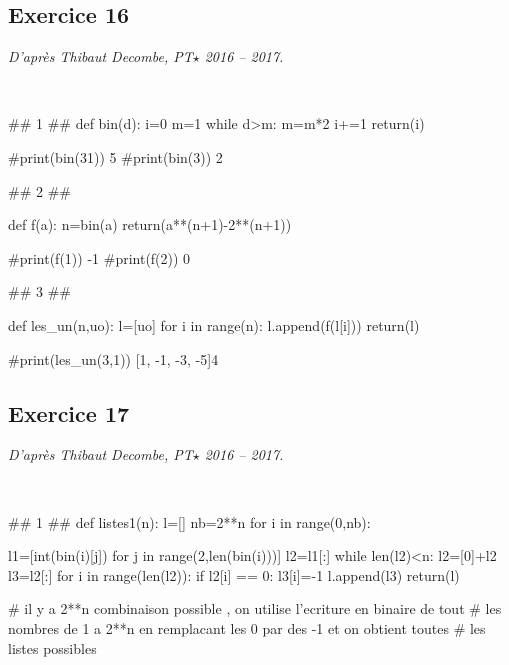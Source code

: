 \documentclass[10pt,fleqn]{article} %
\begin{document}
\subsection*{Exercice 16}
\textit{D'après Thibaut Decombe, PT$\star$ 2016 -- 2017.}
\begin{corrige}
$\quad$
\begin{python}
## 1 ##
def bin(d):
    i=0
    m=1
    while d>m:
        m=m*2
        i+=1
    return(i)

#print(bin(31))     5
#print(bin(3))      2

## 2 ##

def f(a):
    n=bin(a)
    return(a**(n+1)-2**(n+1))

#print(f(1))      -1
#print(f(2))       0


## 3 ##

def les_un(n,uo):
    l=[uo]
    for i in range(n):
        l.append(f(l[i]))
    return(l)

#print(les_un(3,1))     [1, -1, -3, -5]4
\end{python}
\end{corrige}


\subsection*{Exercice 17}
\textit{D'après Thibaut Decombe, PT$\star$ 2016 -- 2017.}
\begin{corrige}
$\quad$
\begin{python}
## 1 ##
def listes1(n):
    l=[]
    nb=2**n
    for i in range(0,nb):
        
        l1=[int(bin(i)[j]) for j in range(2,len(bin(i)))]
        l2=l1[:]
        while len(l2)<n:
            l2=[0]+l2
        l3=l2[:]
        for i in range(len(l2)):
            if l2[i] == 0:
                l3[i]=-1
        l.append(l3)
    return(l)

# il y a 2**n combinaison possible , on utilise l'ecriture en binaire de tout
# les nombres de 1 a 2**n en remplacant les 0 par des -1 et on obtient toutes
# les listes possibles
\end{python}
\end{corrige}
\end{document}

